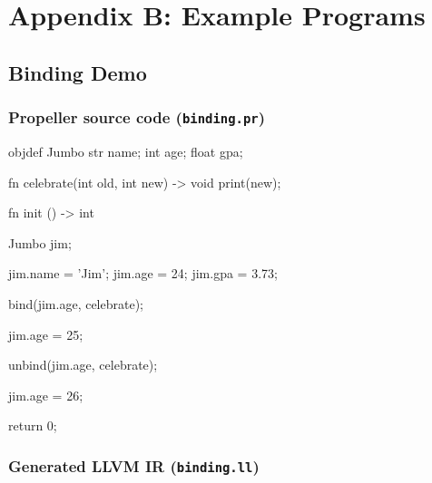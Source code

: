 \section{Appendix B: Example Programs}

\subsection{Binding Demo}

\subsubsection{Propeller source code (\texttt{binding.pr})}

\begin{mylisting}
objdef Jumbo
{
  str name;
  int age;
  float gpa;
}

fn celebrate(int old, int new) -> void
{
  print(new);
}

fn init () -> int
{
  Jumbo jim;

  jim.name = 'Jim';
  jim.age  = 24;
  jim.gpa  = 3.73;

  bind(jim.age, celebrate);

  jim.age = 25;

  unbind(jim.age, celebrate);

  jim.age = 26;

  return 0;
}
\end{mylisting}

\subsubsection{Generated LLVM IR (\texttt{binding.ll})}

